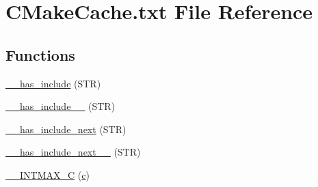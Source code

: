 \hypertarget{CMakeCache_8txt}{}\section{C\+Make\+Cache.\+txt File Reference}
\label{CMakeCache_8txt}
\subsection*{Functions}
\begin{DoxyCompactItemize}
\item 
\hyperlink{CMakeCache_8txt_a15033d43fd4881ecb41d0a9ef3f98c8b}{\+\_\+\+\_\+has\+\_\+include} (S\+TR)
\item 
\hyperlink{CMakeCache_8txt_a97e2b5b7d48e0c704f01b437bbb41bc3}{\+\_\+\+\_\+has\+\_\+include\+\_\+\+\_\+} (S\+TR)
\item 
\hyperlink{CMakeCache_8txt_a6bc72b80bcdbfe30be5d38536affde6f}{\+\_\+\+\_\+has\+\_\+include\+\_\+next} (S\+TR)
\item 
\hyperlink{CMakeCache_8txt_ac96b06945e62d6ea6764b6d86745ec26}{\+\_\+\+\_\+has\+\_\+include\+\_\+next\+\_\+\+\_\+} (S\+TR)
\item 
\hyperlink{CMakeCache_8txt_a2f10a19f2682f0eb61615edae3fa69ef}{\+\_\+\+\_\+\+I\+N\+T\+M\+A\+X\+\_\+C} (\hyperlink{CMakeCache_8txt_aac1d6a1710812201527c735f7c6afbaa}{c})
\end{DoxyCompactItemize}
